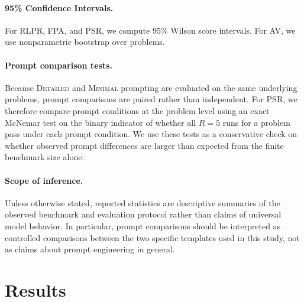 \documentclass[11pt]{article}
\begin{document}
\paragraph{95\% Confidence Intervals.}
For RLPR, FPA, and PSR, we compute 95\% Wilson score intervals. For AV, we use nonparametric bootstrap over problems.

\paragraph{Prompt comparison tests.}
Because \textsc{Detailed} and \textsc{Minimal} prompting are evaluated on the same underlying problems, prompt comparisons are paired rather than independent. For PSR, we therefore compare prompt conditions at the problem level using an exact McNemar test on the binary indicator of whether all $R=5$ runs for a problem pass under each prompt condition. We use these tests as a conservative check on whether observed prompt differences are larger than expected from the finite benchmark size alone.

\paragraph{Scope of inference.}
Unless otherwise stated, reported statistics are descriptive summaries of the observed benchmark and evaluation protocol rather than claims of universal model behavior. In particular, prompt comparisons should be interpreted as controlled comparisons between the two specific templates used in this study, not as claims about prompt engineering in general.

\section{Results}
\end{document}
